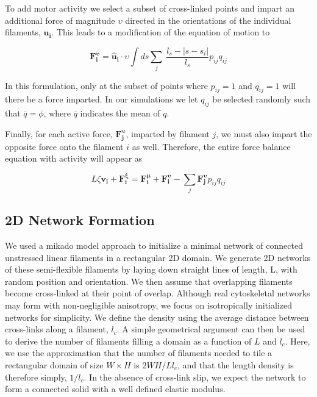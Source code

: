 \documentclass[10pt,letterpaper]{article}
\begin{document}
To add motor activity we select a subset of cross-linked points and impart an additional force of magnitude $\upsilon$ directed in the orientations of the individual filaments, $\mathbf{u_i}$.  This leads to a modification of the equation of motion to

\begin{equation}
\label{eqn:moto}
\mathbf{F^{\upsilon}_i}= \mathbf{\hat{u}_i}\cdot\upsilon\int ds \sum _j \:  \frac{l_s-|s-s_i|}{l_s} p_{ij}q_{ij}
\end{equation}

In this formulation, only at the subset of points where  $p_{ij}=1$ and $q_{ij}=1$ will there be a force imparted.  In our simulations we let $q_{ij}$ be selected randomly such that $\bar{q}=\phi$, where $\bar{q}$ indicates the mean of $q$.

Finally, for each active force, $\mathbf{F^{\upsilon}_j}$, imparted by filament $j$, we must also impart the opposite force onto the filament $i$ as well.  Therefore, the entire force balance equation with activity will appear as

\begin{equation}
\label{eqn:syst3}
L\zeta\mathbf{ v_i} +\mathbf{F^{\xi}_i}= \mathbf{F^{\mu}_i}+\mathbf{F^{\upsilon}_i} - \sum_{j}\mathbf{F^{\upsilon}_j}p_{ij}q_{ij}
\end{equation}

\subsection*{2D Network Formation}

We used a mikado model approach \cite{Unterberger2014} to initialize a minimal network of connected unstressed linear filaments in a rectangular 2D domain. We generate 2D networks of these semi-flexible filaments by laying down straight lines of length, L, with random position and orientation. We then assume that overlapping filaments become cross-linked at their point of overlap. Although real cytoskeletal networks may form with non-negligible anisotropy, we focus on isotropically initialized networks for simplicity. We define the density using the average distance between cross-links along a filament, $l_c$. A simple geometrical argument can then be used to derive the number of filaments filling a domain as a function of $L$ and $l_c$\cite{theo_hlm}.  Here, we use the approximation that the number of filaments needed to tile a rectangular domain of size $W \times H$  is $2WH/Ll_c$, and that the length density is therefore simply, $1/l_c$. In the absence of cross-link slip, we expect the network to form a connected solid with a well defined elastic modulus\cite{theo_hlm,theo_hlm2}.  
\end{document}
